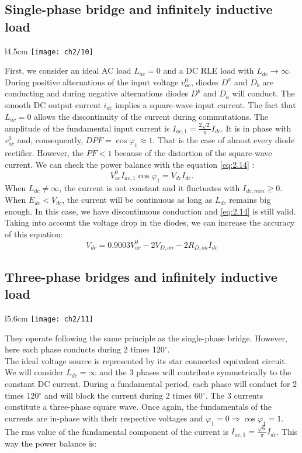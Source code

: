 	\subsection{Single-phase bridge and infinitely inductive load}
		\begin{wrapfigure}[4]{l}{4.5cm}
		\vspace{-5mm}
		\texttt{[image: ch2/10]}
		\end{wrapfigure} 
		First, we consider an ideal AC load $L_{ac} = 0$ and a DC RLE load with $L_{dc}\rightarrow \infty$. During positive alternations of the input voltage $v_{ac}^0$, diodes $D^a$ and $D_b$ are conducting and during negative alternations diodes $D^b$ and $D_a$ will conduct. The smooth DC output current $i_{dc}$ implies a square-wave input current. The fact that $L_{ac} = 0$ allows the discontinuity of the current during commutations. The amplitude of the fundamental input current is $I_{ac,1} = \frac{2\sqrt{2}}{\pi} I_{dc}$. It is in phase with $v_{ac}^0$ and, consequently, $DPF = \cos \varphi _1 \approx 1$. That is the case of almost every diode rectifier. However, the $PF<1$ because of the distortion of the square-wave current. We can check the power balance with the equation \eqref{eq:2.14} : 
		\begin{equation}
			V_{ac}^0I_{ac,1} \cos \varphi _1 = V_{dc} I_{dc}.
		\end{equation}
		When $L_{dc} \neq \infty$, the current is not constant and it fluctuates with $I_{dc,min} \geq 0$. When $E_{dc}<V_{dc}$, the current will be continuous as long as $L_{dc}$ remains big enough. In this case, we have discontinuous conduction and \eqref{eq:2.14} is still valid. Taking into account the voltage drop in the diodes, we can increase the accuracy of this equation: 
		\begin{equation}
			V_{dc} = 0.9003 V_{ac}^0 - 2 V_{D,on} - 2 R_{D,on} I_{dc}
		\end{equation}
		
	\subsection{Three-phase bridges and infinitely inductive load}
		\begin{wrapfigure}[13]{l}{5.6cm}
		\vspace{-5mm}
		\texttt{[image: ch2/11]}
		\end{wrapfigure} 
		They operate following the same principle as the single-phase bridge. However, here each phase conducts during 2 times 120$^\circ$.\\
		The ideal voltage source is represented by its star connected equivalent circuit. We will consider $L_{dc} = \infty$ and the 3 phases will contribute symmetrically to the constant DC current. During a fundamental period, each phase will conduct for 2 times 120$^\circ$  and will block the current during 2 times 60$^\circ$. The 3 currents constitute a three-phase square wave. Once again, the fundamentals of the currents are in-phase with their respective voltages and $\varphi _1 = 0 \Rightarrow \cos \varphi _1 = 1$. The rms value of the fundamental component of the current is $I_{ac,1} = \frac{\sqrt{6}}{\pi}I_{dc}$. This way the power balance is:

